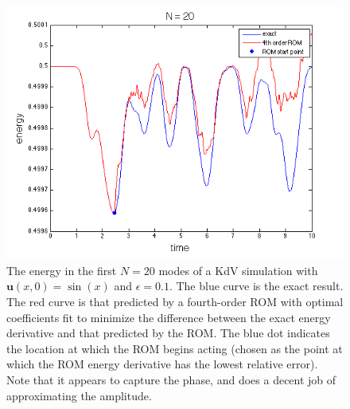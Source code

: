 \documentclass{article}
\begin{document}
\begin{figure}[h]
\includegraphics[width=\textwidth]{4th_order_20.png}
\caption{The energy in the first $N=20$ modes of a KdV simulation with $\mathbf{u}(x,0) = \sin(x)$ and $\epsilon=0.1$. The blue curve is the exact result. The red curve is that predicted by a fourth-order ROM with optimal coefficients fit to minimize the difference between the exact energy derivative and that predicted by the ROM. The blue dot indicates the location at which the ROM begins acting (chosen as the point at which the ROM energy derivative has the lowest relative error). Note that it appears to capture the phase, and does a decent job of approximating the amplitude.}\label{fig:20_4th_order}
\end{figure}
\end{document}
